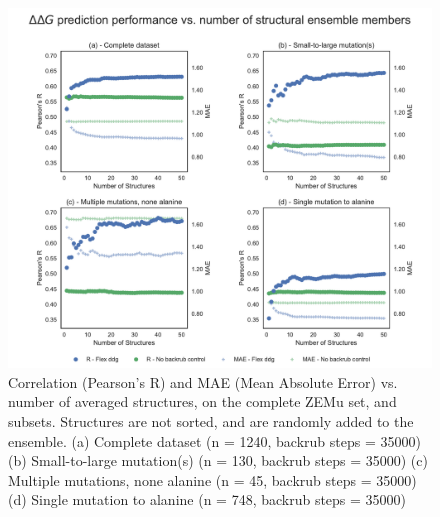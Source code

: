 \begin{figure}
  \includegraphics[width=\textwidth,keepaspectratio]{structs-v-corr-id-zemu-12-60000-rscript-validated-t14.pdf}
  \caption[]{ %
    Correlation (Pearson's R) and MAE (Mean Absolute Error) vs. number of averaged structures, on the complete ZEMu set, and subsets. Structures are not sorted, and are randomly added to the ensemble. 
    (a) Complete dataset (n = 1240, backrub steps = 35000)
    (b) Small-to-large mutation(s) (n = 130, backrub steps = 35000)
    (c) Multiple mutations, none alanine (n = 45, backrub steps = 35000)
    (d) Single mutation to alanine (n = 748, backrub steps = 35000)
  } \label{fig:structs-v-corr-id-zemu-12-60000-rscript-validated-t14}
\end{figure}
